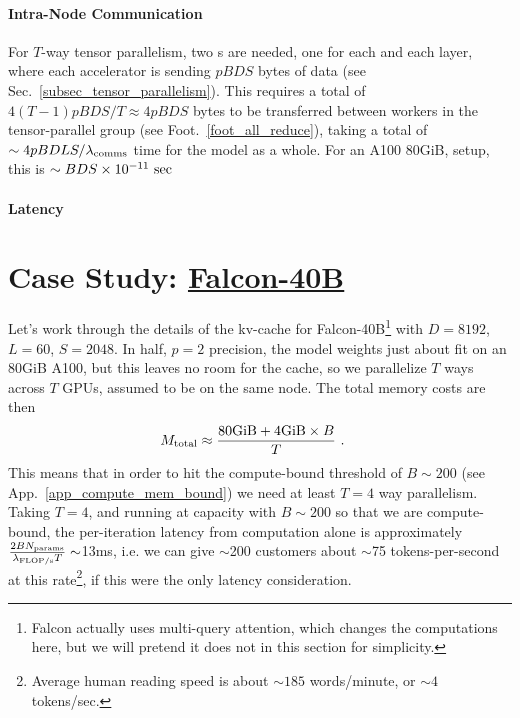 \documentclass[11pt]{article}
\begin{document}
\paragraph{Intra-Node Communication} For $ T $-way tensor parallelism, two s are
needed, one for each  and each  layer, where each
accelerator is sending $ pBDS  $ bytes of data (see Sec.~\ref{subsec_tensor_parallelism}). This
requires a total of $ 4\left ( T-1 \right ) pBDS/T \approx 4pBDS $ bytes to be transferred between
workers in the tensor-parallel group (see Foot.~\ref{foot_all_reduce}), taking a total of $ \sim  4pBDLS/
\lambda _{ {\rm comms} }  $ time for the model as a whole. For an A100 80GiB,  setup, this is $ \sim
BDS \times  10 ^{ -11 } \ {\rm sec} $


\paragraph{Latency}



\section{Case Study: \href{https://huggingface.co/tiiuae/falcon-40b-instruct?_sm_vck=j230jZ2ssDkkPfJTfRt6tjQNTQZJ65N7VDWmj5Ff6f3jZ3mhh2Pq}{Falcon-40B}}

Let's work through the details of the kv-cache for Falcon-40B\footnote{Falcon actually uses
multi-query attention, which changes the computations here, but we will pretend it does not in this
section for simplicity.} with $ D=8192 $, $ L=60 $, $ S=2048 $.  In half, $ p=2 $ precision, the model weights just about fit on an
80GiB A100, but this leaves no room for the cache, so we parallelize $ T $ ways across $ T $ GPUs,
assumed to be on the same node. The total memory costs are then
\begin{align}
    M _{ {\rm  total} } &\approx  \frac{ {\rm 80GiB} + {\rm 4GiB}\times B }{ T } \ .
\end{align}
This means that in order to hit the compute-bound threshold of $ B \sim 200 $ (see
App.~\ref{app_compute_mem_bound}) we need at least $ T=4 $ way parallelism.  Taking $ T=4 $, and
running at capacity with $ B \sim 200$ so that we are compute-bound, the per-iteration latency from
computation alone is approximately $ \frac{2BN _{ {\rm params} } }{ \lambda _{ {\rm FLOP/s} } T} \sim
$13ms, i.e. we can give $ \sim $200 customers about $ \sim $75 tokens-per-second at this
rate\footnote{Average human reading speed is about $ \sim 185$ words/minute, or $ \sim 4
$tokens/sec.}, if this were the only latency consideration.
\end{document}
